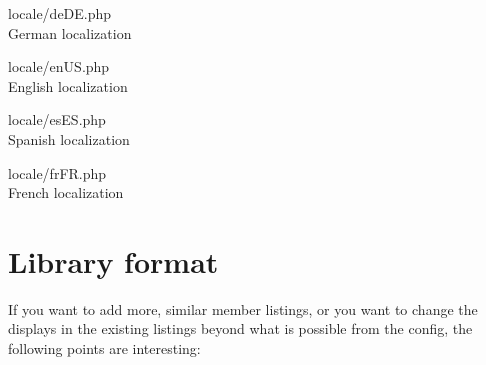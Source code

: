 \documentclass[12pt, a4paper]{article}
\begin{document}
\begin{description}
\medskip
\item{locale/deDE.php}\\
	German localization
\item{locale/enUS.php}\\
	English localization
\item{locale/esES.php}\\
	Spanish localization
\item{locale/frFR.php}\\
	French localization
\end{description}

\section{Library format}
If you want to add more, similar member listings, or you want to change the
displays in the existing listings beyond what is possible from the config,
the following points are interesting:
\end{document}
